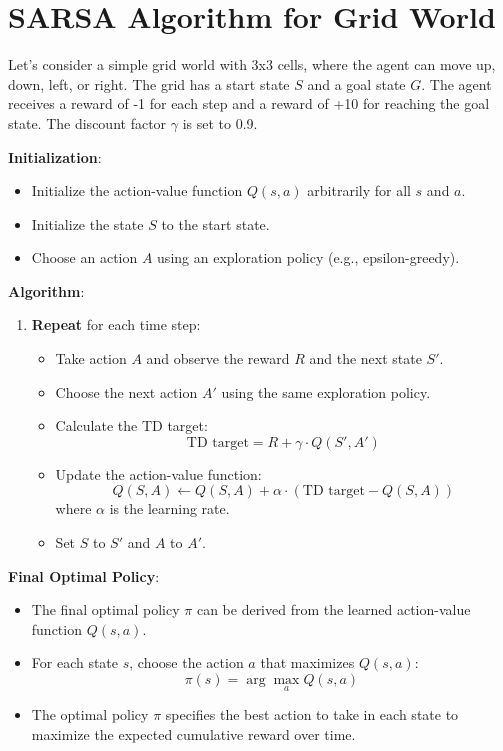 \documentclass{article}
\begin{document}
\section*{SARSA Algorithm for Grid World}

Let's consider a simple grid world with 3x3 cells, where the agent can move up, down, left, or right. The grid has a start state \( S \) and a goal state \( G \). The agent receives a reward of -1 for each step and a reward of +10 for reaching the goal state. The discount factor \( \gamma \) is set to 0.9.

\textbf{Initialization}:
\begin{itemize}
    \item Initialize the action-value function \( Q(s, a) \) arbitrarily for all \( s \) and \( a \).
    \item Initialize the state \( S \) to the start state.
    \item Choose an action \( A \) using an exploration policy (e.g., epsilon-greedy).
\end{itemize}

\textbf{Algorithm}:
\begin{enumerate}
    \item \textbf{Repeat} for each time step:
    \begin{itemize}
        \item Take action \( A \) and observe the reward \( R \) and the next state \( S' \).
        \item Choose the next action \( A' \) using the same exploration policy.
        \item Calculate the TD target:
        \[ \text{TD target} = R + \gamma \cdot Q(S', A') \]
        \item Update the action-value function:
        \[ Q(S, A) \leftarrow Q(S, A) + \alpha \cdot (\text{TD target} - Q(S, A)) \]
        where \( \alpha \) is the learning rate.
        \item Set \( S \) to \( S' \) and \( A \) to \( A' \).
    \end{itemize}
\end{enumerate}

\textbf{Final Optimal Policy}:
\begin{itemize}
    \item The final optimal policy \( \pi \) can be derived from the learned action-value function \( Q(s, a) \).
    \item For each state \( s \), choose the action \( a \) that maximizes \( Q(s, a) \):
    \[ \pi(s) = \arg\max_a Q(s, a) \]
    \item The optimal policy \( \pi \) specifies the best action to take in each state to maximize the expected cumulative reward over time.
\end{itemize}
\end{document}
